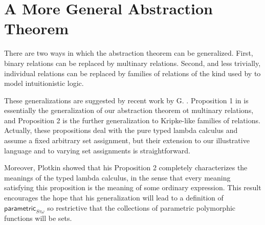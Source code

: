 \documentclass[sigplan,screen,nonacm,balance=false]{acmart}
\theoremstyle{plain}
\newcommand{\para}{\mathsf{parametric}}
\begin{document}
\section{A More General Abstraction Theorem} \label{sec:gen-abs}

There are two ways in which the abstraction theorem can be generalized.
First, binary relations can be replaced by multinary relations.
Second, and less trivially, individual relations can be replaced by families of relations of the kind used by \citet{intuitionistic} to model intuitionistic logic.

These generalizations are suggested by recent work by G. \citet{definability}.
Proposition 1 in \citep{definability} is essentially the generalization of our abstraction theorem ot multinary relations, and Proposition 2 is the further generalization to Kripke-like families of relations.
Actually, these propositions deal with the pure typed lambda calculus and assume a fixed arbitrary set assignment, but their extension to our illustrative language and to varying set assignments is straightforward.

Moreover, Plotkin showed that his Proposition 2 completely characterizes the meanings of the typed lambda calculus, in the sense that every meaning satisfying this proposition is the meaning of some ordinary expression.
This result encourages the hope that his generalization will lead to a definition of $\para_{S \tau \omega}$ so restrictive that the collections of parametric polymorphic functions will be sets.
\end{document}
